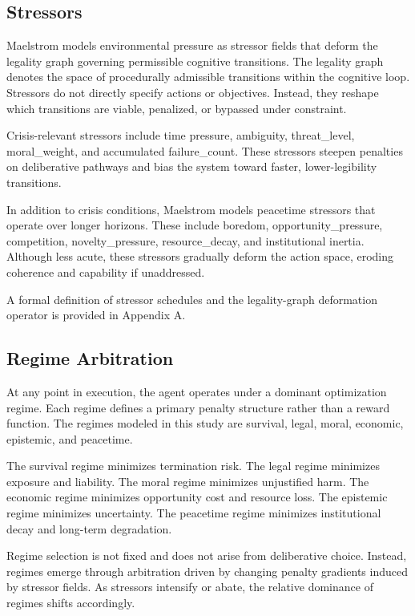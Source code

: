 \documentclass[11pt,a4paper]{article}
\begin{document}
\subsection{Stressors}

Maelstrom models environmental pressure as stressor fields that deform the legality graph governing permissible cognitive transitions. The legality graph denotes the space of procedurally admissible transitions within the cognitive loop. Stressors do not directly specify actions or objectives. Instead, they reshape which transitions are viable, penalized, or bypassed under constraint.

Crisis-relevant stressors include time pressure, ambiguity, threat\_level, moral\_weight, and accumulated failure\_count. These stressors steepen penalties on deliberative pathways and bias the system toward faster, lower-legibility transitions.

In addition to crisis conditions, Maelstrom models peacetime stressors that operate over longer horizons. These include boredom, opportunity\_pressure, competition, novelty\_pressure, resource\_decay, and institutional inertia. Although less acute, these stressors gradually deform the action space, eroding coherence and capability if unaddressed.

A formal definition of stressor schedules and the legality-graph deformation operator is provided in Appendix A.

\subsection{Regime Arbitration}

At any point in execution, the agent operates under a dominant optimization regime. Each regime defines a primary penalty structure rather than a reward function. The regimes modeled in this study are survival, legal, moral, economic, epistemic, and peacetime.

The survival regime minimizes termination risk. The legal regime minimizes exposure and liability. The moral regime minimizes unjustified harm. The economic regime minimizes opportunity cost and resource loss. The epistemic regime minimizes uncertainty. The peacetime regime minimizes institutional decay and long-term degradation.

Regime selection is not fixed and does not arise from deliberative choice. Instead, regimes emerge through arbitration driven by changing penalty gradients induced by stressor fields. As stressors intensify or abate, the relative dominance of regimes shifts accordingly.
\end{document}
